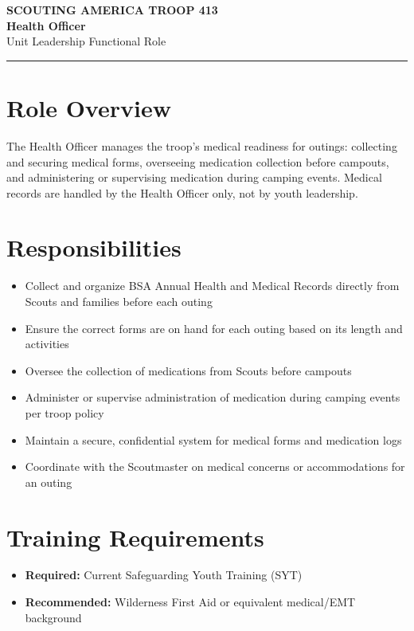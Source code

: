 \documentclass[11pt, letterpaper]{article}
\begin{document}
\begin{center}
  {\small\color{scoutgreen}\textbf{SCOUTING AMERICA \textbullet{} TROOP 413}} \\[4pt]
  {\fontsize{20pt}{24pt}\selectfont\bfseries\color{scoutgreen} Health Officer} \\[4pt]
  {\large\color{accent} Unit Leadership \textbullet{} Functional Role} \\[4pt]
  \textcolor{accent}{\rule{0.6\linewidth}{1pt}}
\end{center}

\vspace{0.3em}

\begin{minipage}[t]{0.48\linewidth}
\raggedright

\section{Role Overview}
The Health Officer manages the troop's medical readiness for outings: collecting and securing medical forms, overseeing medication collection before campouts, and administering or supervising medication during camping events. Medical records are handled by the Health Officer only, not by youth leadership.

\vspace{0.4em}
\section{Responsibilities}
\begin{itemize}
  \item Collect and organize BSA Annual Health and Medical Records directly from Scouts and families before each outing
  \item Ensure the correct forms are on hand for each outing based on its length and activities
  \item Oversee the collection of medications from Scouts before campouts
  \item Administer or supervise administration of medication during camping events per troop policy
  \item Maintain a secure, confidential system for medical forms and medication logs
  \item Coordinate with the Scoutmaster on medical concerns or accommodations for an outing
\end{itemize}

\section{Training Requirements}
\begin{itemize}
  \item \textbf{Required:} Current Safeguarding Youth Training (SYT)
  \item \textbf{Recommended:} Wilderness First Aid or equivalent medical/EMT background
\end{itemize}

\end{minipage}
\end{document}
